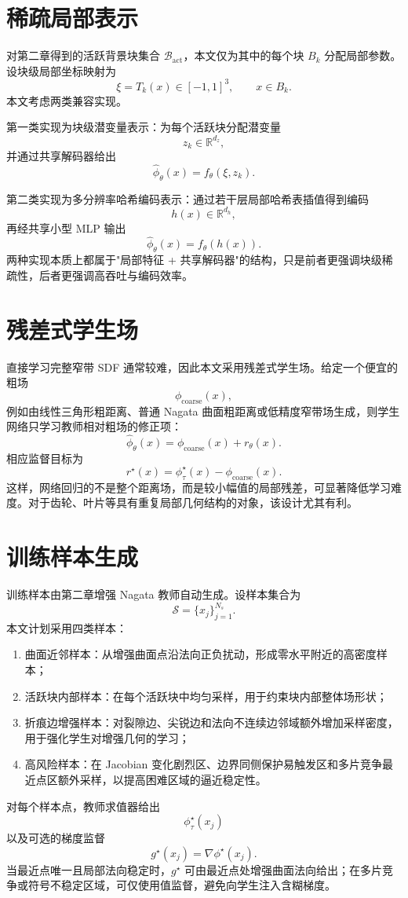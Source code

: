 \documentclass[12pt,oneside]{ctexbook}
\begin{document}
\section{稀疏局部表示}
对第二章得到的活跃背景块集合 $\mathcal B_{\mathrm{act}}$，本文仅为其中的每个块 $B_k$ 分配局部参数。设块级局部坐标映射为
\[
\xi=T_k(x)\in[-1,1]^3,
\qquad x\in B_k.
\]
本文考虑两类兼容实现。

第一类实现为块级潜变量表示：为每个活跃块分配潜变量
\[
z_k\in\mathbb R^{d_z},
\]
并通过共享解码器给出
\[
\hat\phi_\theta(x)=f_\theta(\xi,z_k).
\]

第二类实现为多分辨率哈希编码表示：通过若干层局部哈希表插值得到编码
\[
h(x)\in\mathbb R^{d_h},
\]
再经共享小型 MLP 输出
\[
\hat\phi_\theta(x)=f_\theta(h(x)).
\]
两种实现本质上都属于"局部特征 + 共享解码器"的结构，只是前者更强调块级稀疏性，后者更强调高吞吐与编码效率。

\section{残差式学生场}
直接学习完整窄带 SDF 通常较难，因此本文采用残差式学生场。给定一个便宜的粗场
\[
\phi_{\mathrm{coarse}}(x),
\]
例如由线性三角形粗距离、普通 Nagata 曲面粗距离或低精度窄带场生成，则学生网络只学习教师相对粗场的修正项：
\[
\hat\phi_\theta(x)=\phi_{\mathrm{coarse}}(x)+r_\theta(x).
\]
相应监督目标为
\[
r^\star(x)=\phi^\star_\tau(x)-\phi_{\mathrm{coarse}}(x).
\]
这样，网络回归的不是整个距离场，而是较小幅值的局部残差，可显著降低学习难度。对于齿轮、叶片等具有重复局部几何结构的对象，该设计尤其有利。

\section{训练样本生成}
训练样本由第二章增强 Nagata 教师自动生成。设样本集合为
\[
\mathcal S=\{x_j\}_{j=1}^{N_s}.
\]
本文计划采用四类样本：
\begin{enumerate}[label=\arabic*)]
  \item 曲面近邻样本：从增强曲面点沿法向正负扰动，形成零水平附近的高密度样本；
  \item 活跃块内部样本：在每个活跃块中均匀采样，用于约束块内部整体场形状；
  \item 折痕边增强样本：对裂隙边、尖锐边和法向不连续边邻域额外增加采样密度，用于强化学生对增强几何的学习；
  \item 高风险样本：在 Jacobian 变化剧烈区、边界同侧保护易触发区和多片竞争最近点区额外采样，以提高困难区域的逼近稳定性。
\end{enumerate}
对每个样本点，教师求值器给出
\[
\phi^\star_\tau(x_j)
\]
以及可选的梯度监督
\[
g^\star(x_j)=\nabla\phi^\star(x_j).
\]
当最近点唯一且局部法向稳定时，$g^\star$ 可由最近点处增强曲面法向给出；在多片竞争或符号不稳定区域，可仅使用值监督，避免向学生注入含糊梯度。
\end{document}
